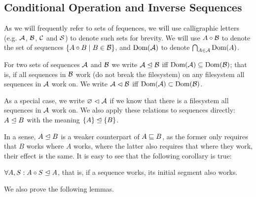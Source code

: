 

\subsection{Conditional Operation and Inverse Sequences}

\begin{mydef}
As we will frequently refer to sets of fequences,
we will use calligraphic letters (e.g. $\mathcal{A}$, $\mathcal{B}$, $\mathcal{C}$ and $\mathcal{S}$)
to denote such sets for brevity.
We will use $A\circ\mathcal{B}$ to denote the set of sequences $\{A\circ B\mathrel{|} B\in\mathcal{B}\}$,
and $\textrm{Dom}({\mathcal{A}})$ to denote $\bigcap_{A\in\mathcal{A}} \textrm{Dom}({A})$.
\end{mydef}


\begin{mydef}[$\worksmsign$, $\worksmeqsign$]\label{def_works}
For two sets of sequences $\mathcal{A}$ and $\mathcal{B}$
we write ${\mathcal{A}}\trianglelefteq{\mathcal{B}}$ iff $\textrm{Dom}({\mathcal{A}}) \subseteq \textrm{Dom}({\mathcal{B}})$;
that is, if all sequences in $\mathcal{B}$ work (do not break the filesystem)
on any filesystem all sequences in $\mathcal{A}$ work on.
We write ${\mathcal{A}}\vartriangleleft{\mathcal{B}}$ iff $\textrm{Dom}({\mathcal{A}}) \subset \textrm{Dom}({\mathcal{B}})$.

As a special case, we write ${\varnothing}\vartriangleleft{\mathcal{A}}$ if we know that there is a filesystem
all sequences in $\mathcal{A}$ work on.
We also apply these relations to sequences directly:
${A}\trianglelefteq{B}$ with the meaning ${\{A\}}\trianglelefteq{\{B\}}$.
\end{mydef}

In a sense, $A\trianglelefteq B$ is a weaker counterpart of $A\sqsubseteq B$, as the former
only requires that $B$ works where $A$ works, where the latter also requires
that where they work, their effect is the same.
It is easy to see that the following corollary is true:

\begin{mycor}\label{worksextpostfix}
$\forall A,S: {A\circ S}\trianglelefteq{A}$, that is, if a sequence works, its initial segment also works.
\end{mycor}

We also prove the following lemmas.

